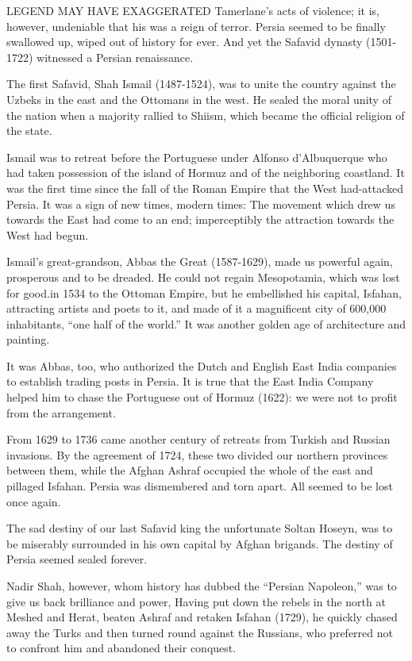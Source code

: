 
LEGEND MAY HAVE EXAGGERATED Tamerlane’s acts of violence; it is, however, undeniable that his was a reign of terror. Persia seemed to be finally swallowed up, wiped out of history for ever. And yet the Safavid dynasty (1501-1722) witnessed a Persian renaissance. 

The first Safavid, Shah Ismail (1487-1524), was to unite the country against the Uzbeks in the east and the Ottomans in the west. He sealed the moral unity of the nation when a majority rallied to Shiism, which became the official religion of the state. 


Ismail was to retreat before the Portuguese under Alfonso d’Albuquerque who had taken possession of the island of Hormuz and of the neighboring coastland. It was the first time since the fall of the Roman Empire that the West had-attacked Persia. It was a sign of new times, modern times: The movement which drew us towards the East had come to an end; imperceptibly the attraction towards the West had begun. 

Ismail's great-grandson, Abbas the Great (1587-1629), made us powerful again, prosperous and to be dreaded. He could not regain Mesopotamia, which was lost for good.in 1534 to the Ottoman Empire, but he embellished his capital, Isfahan, attracting artists and poets to it, and made of it a magnificent city of 600,000 inhabitants, “one half of the world.” It was another golden age of architecture and painting. 

It was Abbas, too, who authorized the Dutch and English East India companies to establish trading posts in Persia. It is true that the East India Company helped him to chase the Portuguese out of Hormuz (1622): we were not to profit from the arrangement. 

From 1629 to 1736 came another century of retreats from Turkish and Russian invasions. By the agreement of 1724, these two divided our northern provinces between them, while the Afghan Ashraf occupied the whole of the east and pillaged Isfahan. Persia was dismembered and torn apart. All seemed to be lost once again. 

The sad destiny of our last Safavid king the unfortunate Soltan Hoseyn, was to be miserably surrounded in his own capital by Afghan brigands. The destiny of Persia seemed sealed forever. 


Nadir Shah, however, whom history has dubbed the “Persian Napoleon,” was to give us back brilliance and power, Having put down the rebels in the north at Meshed and Herat, beaten Ashraf and retaken Isfahan (1729), he quickly chased away the Turks and then turned round against the Russians, who preferred not to confront him and abandoned their conquest. 

